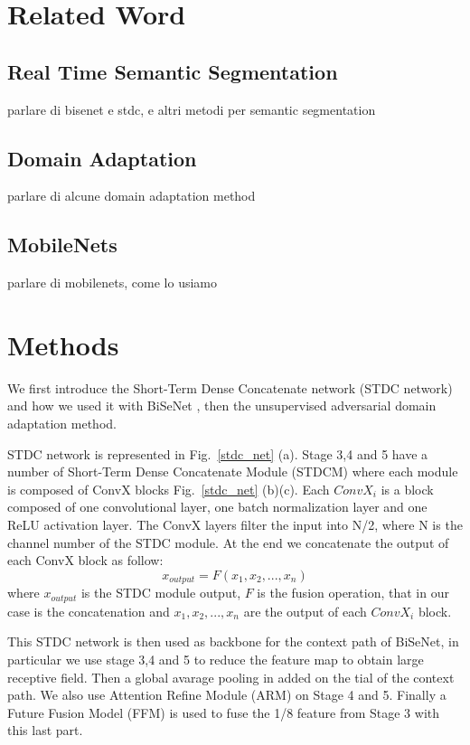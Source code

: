 \documentclass[conference]{IEEEtran}
\begin{document}
\section{Related Word}

\subsection{Real Time Semantic Segmentation}
parlare di bisenet e stdc, e altri metodi per semantic segmentation
\subsection{Domain Adaptation}
parlare di alcune domain adaptation method
\subsection{MobileNets}
parlare di mobilenets, come lo usiamo 
\section{Methods}

We first introduce the Short-Term Dense Concatenate network (STDC network) and how we used it with BiSeNet \cite{b2},
then the unsupervised adversarial domain adaptation method.

STDC network \cite{b1} is represented in Fig.~\ref{stdc_net} (a). Stage 3,4 and 5 have a number of Short-Term Dense Concatenate Module (STDCM)
where each module is composed of ConvX blocks Fig.~\ref{stdc_net} (b)(c). Each \(ConvX_i\) is a block composed of one convolutional layer,
one batch normalization layer and one ReLU activation layer. The ConvX layers filter the input into N/2, where N is the channel number
of the STDC module. At the end we concatenate the output of each ConvX block as follow: 
\[x_{output} = F(x_1,x_2,...,x_n)\]
where \(x_{output}\) is the STDC module output, \(F\) is the fusion operation, that in our case is the concatenation and \(x_1,x_2,
...,x_n\) are the output of each \(ConvX_i\) block.

This STDC network is then used as backbone for the context path of BiSeNet, in particular we use stage 3,4 and 5 to reduce the 
feature map to obtain large receptive field. Then a global avarage pooling in added on the tial of the context path. We also use
Attention Refine Module (ARM) on Stage 4 and 5. Finally a Future Fusion Model (FFM) is used to fuse the 1/8
feature from Stage 3 with this last part.
\end{document}

